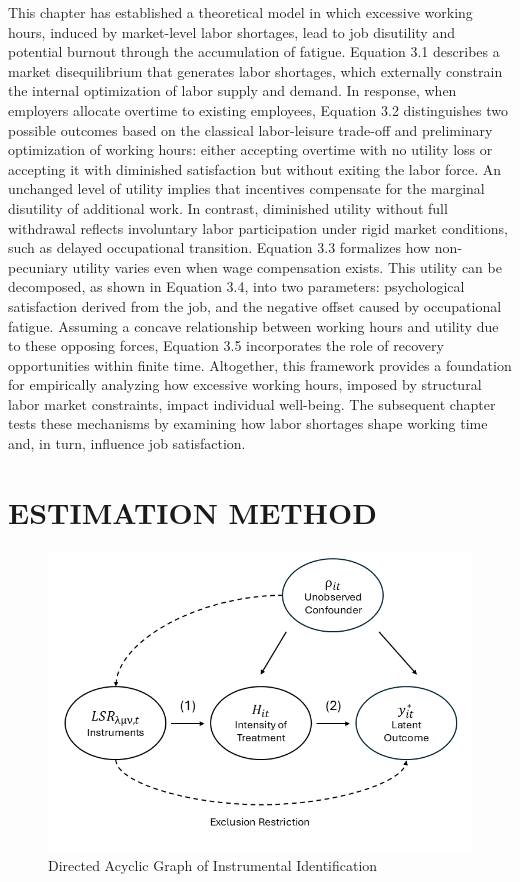 \documentclass[
  12pt,
]{article}
\begin{document}
This chapter has established a theoretical model in which excessive
working hours, induced by market-level labor shortages, lead to job
disutility and potential burnout through the accumulation of fatigue.
Equation 3.1 describes a market disequilibrium that generates labor
shortages, which externally constrain the internal optimization of labor
supply and demand. In response, when employers allocate overtime to
existing employees, Equation 3.2 distinguishes two possible outcomes
based on the classical labor-leisure trade-off and preliminary
optimization of working hours: either accepting overtime with no utility
loss or accepting it with diminished satisfaction but without exiting
the labor force. An unchanged level of utility implies that incentives
compensate for the marginal disutility of additional work. In contrast,
diminished utility without full withdrawal reflects involuntary labor
participation under rigid market conditions, such as delayed
occupational transition. Equation 3.3 formalizes how non-pecuniary
utility varies even when wage compensation exists. This utility can be
decomposed, as shown in Equation 3.4, into two parameters: psychological
satisfaction derived from the job, and the negative offset caused by
occupational fatigue. Assuming a concave relationship between working
hours and utility due to these opposing forces, Equation 3.5
incorporates the role of recovery opportunities within finite time.
Altogether, this framework provides a foundation for empirically
analyzing how excessive working hours, imposed by structural labor
market constraints, impact individual well-being. The subsequent chapter
tests these mechanisms by examining how labor shortages shape working
time and, in turn, influence job satisfaction.

\newpage

\section{ESTIMATION METHOD}\label{estimation-method}

\begin{figure}
\centering
\includegraphics[width=5.20833in,height=\textheight,keepaspectratio]{figure/DAG.png}
\caption{Directed Acyclic Graph of Instrumental Identification}
\end{figure}
\end{document}
